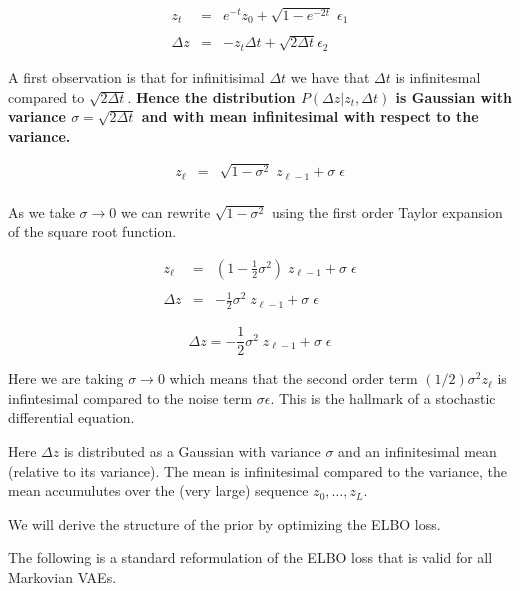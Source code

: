 {

\begin{eqnarray*}
z_t& = & e^{-t}z_0 + \sqrt{1 - e^{-2t}}\;\epsilon_1 \\
\\
\Delta z & = & - z_t \Delta t + \sqrt{2\Delta t} \epsilon_2
\end{eqnarray*}

\vfill
A first observation is that for infinitisimal $\Delta t$ we have that $\Delta t$  is infinitesmal compared to $\sqrt{2\Delta t}$.  {\bf Hence the
distribution $P(\Delta z|z_{t},\Delta t)$ is Gaussian with variance $\sigma = \sqrt{2\Delta t}$ and with mean infinitesimal with respect to the variance.}


\begin{eqnarray*}
z_\ell& = & \sqrt{1 - \sigma^2}\;z_{\ell-1} + \sigma\;\epsilon \\
\end{eqnarray*}

As we take $\sigma \rightarrow  0$ we can rewrite $\sqrt{1-\sigma^2}$ using the first order Taylor expansion of the square root function.

\begin{eqnarray*}
z_\ell & = &  \left(1 - \frac{1}{2}\sigma^2\right)\;z_{\ell-1} + \sigma\;\epsilon \\
\\
\Delta z & = &  - \frac{1}{2}\sigma^2\;z_{\ell-1} + \sigma\;\epsilon
\end{eqnarray*}


$$\Delta z  =   - \frac{1}{2}\sigma^2\;z_{\ell-1} + \sigma\;\epsilon$$

\vfill
Here we are taking $\sigma \rightarrow 0$ which means that the second order term $(1/2)\sigma^2 z_\ell$ is infintesimal compared to the noise term
$\sigma \epsilon$.  This is the hallmark of a stochastic differential equation.

\vfill
Here $\Delta z$ is distributed as a Gaussian with variance $\sigma$ and an infinitesimal mean (relative to its variance).  The mean is infinitesimal compared to the variance,
the mean accumulutes over the (very large) sequence $z_0,\ldots, z_L$.

We will derive the structure of the prior by optimizing the ELBO loss.

\vfill
The following is a standard reformulation of the ELBO loss that is valid for all Markovian VAEs.

}
